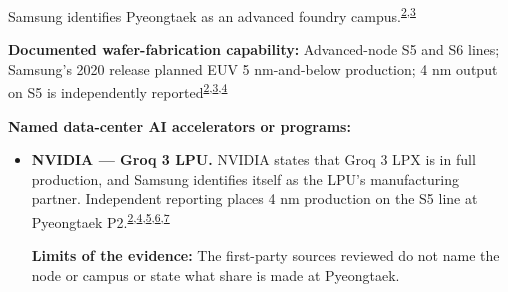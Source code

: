 \begin{minipage}[t][0.90\textheight][t]{\textwidth}
\begin{minipage}[t]{\textwidth}
\begin{minipage}[t]{0.32\textwidth}
\medskip
{\footnotesize Samsung identifies Pyeongtaek as an advanced foundry campus.\nobreak\textsuperscript{\href{\detokenize{https://semiconductor.samsung.com/foundry/manufacturing/manufacturing-sites/}}{\textcolor{accent}{2}},\href{\detokenize{https://semiconductor.samsung.com/news-events/news/samsung-electronics-expands-its-foundry-capacity-with-a-new-production-line-in-pyeongtaek-korea/}}{\textcolor{accent}{3}}}\par}
\medskip
{\footnotesize\textbf{Documented wafer-fabrication capability:} Advanced-node S5 and S6 lines; Samsung's 2020 release planned EUV 5 nm-and-below production; 4 nm output on S5 is independently reported\nobreak\textsuperscript{\href{\detokenize{https://semiconductor.samsung.com/foundry/manufacturing/manufacturing-sites/}}{\textcolor{accent}{2}},\href{\detokenize{https://semiconductor.samsung.com/news-events/news/samsung-electronics-expands-its-foundry-capacity-with-a-new-production-line-in-pyeongtaek-korea/}}{\textcolor{accent}{3}},\href{\detokenize{https://en.sedaily.com/finance/2026/08/25/samsung-foundry-starts-mass-production-of-nvidias-groq3-ai}}{\textcolor{accent}{4}}}\par}
\end{minipage}
\end{minipage}
\par\vspace{0.65em}
\medskip
{\footnotesize\textbf{Named data-center AI accelerators or programs:}\par}
\begin{itemize}[leftmargin=1.25em,itemsep=0.35em,topsep=0.15em,parsep=0pt]
\item {\footnotesize\textbf{NVIDIA --- Groq 3 LPU.} NVIDIA states that Groq 3 LPX is in full production, and Samsung identifies itself as the LPU's manufacturing partner. Independent reporting places 4 nm production on the S5 line at Pyeongtaek P2.\nobreak\textsuperscript{\href{\detokenize{https://semiconductor.samsung.com/foundry/manufacturing/manufacturing-sites/}}{\textcolor{accent}{2}},\href{\detokenize{https://en.sedaily.com/finance/2026/08/25/samsung-foundry-starts-mass-production-of-nvidias-groq3-ai}}{\textcolor{accent}{4}},\href{\detokenize{https://www.asiae.co.kr/en/article/2026032011275710431}}{\textcolor{accent}{5}},\href{\detokenize{https://semiconductor.samsung.com/news-events/tech-blog/architecting-the-ai-era-samsung-electronics-and-nvidia-define-the-future-at-gtc-2026/}}{\textcolor{accent}{6}},\href{\detokenize{https://investor.nvidia.com/news/press-release-details/2026/NVIDIA-Groq-3-LPX-Now-in-Full-Production-With-World-Class-Speed-for-Agentic-AI/default.aspx}}{\textcolor{accent}{7}}}\par {\scriptsize\color{black!62}\textbf{Limits of the evidence:} The first-party sources reviewed do not name the node or campus or state what share is made at Pyeongtaek.\par}}

\end{itemize}
\end{minipage}
